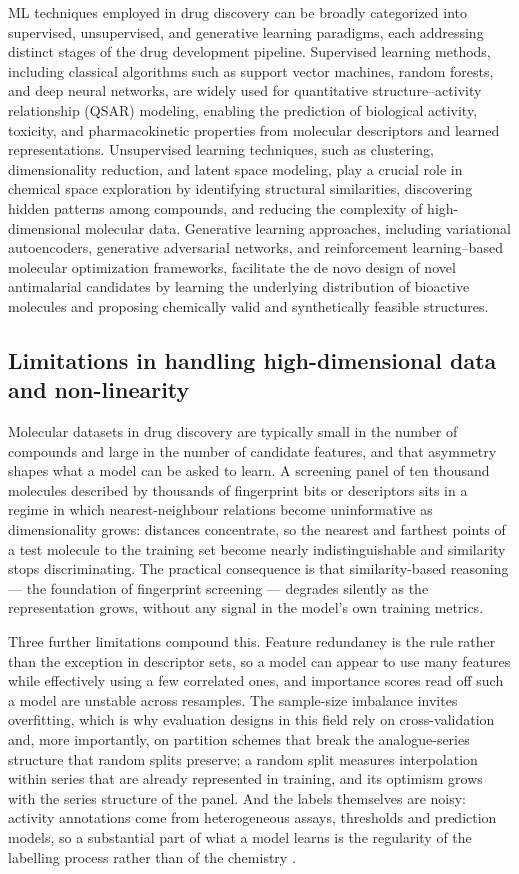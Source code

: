ML techniques employed in drug discovery can be broadly categorized into supervised, unsupervised, and generative learning paradigms, each addressing distinct stages of the drug development pipeline. Supervised learning methods, including classical algorithms such as support vector machines, random forests, and deep neural networks, are widely used for quantitative structure–activity relationship (QSAR) modeling, enabling the prediction of biological activity, toxicity, and pharmacokinetic properties from molecular descriptors and learned representations. Unsupervised learning techniques, such as clustering, dimensionality reduction, and latent space modeling, play a crucial role in chemical space exploration by identifying structural similarities, discovering hidden patterns among compounds, and reducing the complexity of high-dimensional molecular data. Generative learning approaches, including variational autoencoders, generative adversarial networks, and reinforcement learning–based molecular optimization frameworks, facilitate the de novo design of novel antimalarial candidates by learning the underlying distribution of bioactive molecules and proposing chemically valid and synthetically feasible structures.
  
\subsection{Limitations in handling high-dimensional data and non-linearity}

Molecular datasets in drug discovery are typically small in the number of compounds and large in the number of candidate features, and that asymmetry shapes what a model can be asked to learn. A screening panel of ten thousand molecules described by thousands of fingerprint bits or descriptors sits in a regime in which nearest-neighbour relations become uninformative as dimensionality grows: distances concentrate, so the nearest and farthest points of a test molecule to the training set become nearly indistinguishable and similarity stops discriminating. The practical consequence is that similarity-based reasoning --- the foundation of fingerprint screening --- degrades silently as the representation grows, without any signal in the model's own training metrics.

Three further limitations compound this. Feature redundancy is the rule rather than the exception in descriptor sets, so a model can appear to use many features while effectively using a few correlated ones, and importance scores read off such a model are unstable across resamples. The sample-size imbalance invites overfitting, which is why evaluation designs in this field rely on cross-validation and, more importantly, on partition schemes that break the analogue-series structure that random splits preserve; a random split measures interpolation within series that are already represented in training, and its optimism grows with the series structure of the panel. And the labels themselves are noisy: activity annotations come from heterogeneous assays, thresholds and prediction models, so a substantial part of what a model learns is the regularity of the labelling process rather than of the chemistry \cite{CarracedoReboredo2021,YashPatel2019,Ekins2019}.

